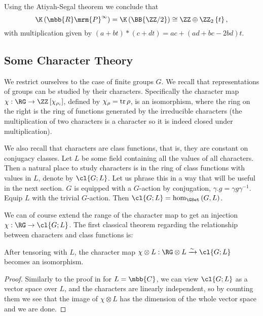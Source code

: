 Using the Atiyah-Segal theorem we conclude that
$$
\K\left({\mbb{R}\mrm{P}}^\infty\right)
= \K\left(\BB{\ZZ/2}\right)
\cong \ZZ \oplus \ZZ_2\left\{t\right\},
$$
with multiplication given by $\left(a+bt\right) * \left(c+dt\right) = ac + (ad+bc-2bd)t$.




\subsection{Some Character Theory}

We restrict ourselves to the case of finite groups $G$.
We recall that representations of groups can be studied by their characters.
Specifically the character map $\chi: \RG \to \ZZ\left[\chi_{\rho_i}\right]$, defined by $\chi_\rho = \operatorname{tr} \rho$, is an isomorphism, where the ring on the right is the ring of functions generated by the irreducible characters (the multiplication of two characters is a character so it is indeed closed under multiplication).

We also recall that characters are class functions, that is, they are constant on conjugacy classes.
Let $L$ be some field containing all the values of all characters.
Then a natural place to study characters is in the ring of class functions with values in $L$, denote by $\cl{G;L}$.
Let us phrase this in a way that will be useful in the next section.
$G$ is equipped with a $G$-action by conjugation, $\gamma.g = \gamma g \gamma^{-1}$.
Equip $L$ with the trivial $G$-action.
Then $\cl{G;L} = \hom_{\GSet}\left(G, L\right)$.

We can of course extend the range of the character map to get an injection $\chi: \RG \to \cl{G;L}$.
The first classical theorem regarding the relationship between characters and class functions is:

\begin{theorem}\label{char-1}
	After tensoring with $L$, the character map $\chi \otimes L: \RG \otimes L \xrightarrow{\sim} \cl{G; L}$ becomes an isomorphism.
\end{theorem}

\begin{proof}
	Similarly to the proof in \cite[9.1]{Ser} for $L = \mbb{C}$, we can view $\cl{G;L}$ as a vector space over $L$, and the characters are linearly independent, so by counting them we see that the image of $\chi \otimes L$ has the dimension of the whole vector space and we are done.
\end{proof}

